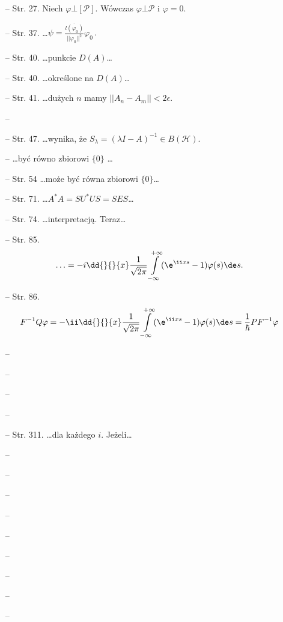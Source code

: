 \begin{itemize}
\item[--] Str. 27. Niech $\varphi \bot [ \mathcal{ P } ]$.  Wówczas
  $\varphi \bot \mathcal{ P }$ i $\varphi = 0$.
\item[--] Str. 37.
  \ldots$\psi = \frac{ \overline{ l ( \varphi_{ 0 } ) } }{ ||
    \varphi_{ 0 } ||^{ 2 } } \varphi_{ 0 } \, .$
\item[--] Str. 40. \ldots punkcie $D( A )$\ldots
\item[--] Str. 40. \ldots określone na $D( A )$\ldots
\item[--] Str. 41. \ldots dużych $n$ mamy
  $|| A_{ n } - A_{ m } || < 2 \epsilon$.
\item[--]
\item[--] Str. 47. \ldots wynika, że
  $S_{ \lambda } = ( \lambda I - A )^{ -1 } \in B( \mathcal{ H } )$.
\item[--] \ldots być równo zbiorowi $\{ 0 \}$ \ldots
\item[--] Str. 54 \ldots może być równa zbiorowi $\{ 0 \}$\ldots
\item[--] Str. 71. \ldots$A^{ * } A = S U^{ * } U S = S E S$\ldots
\item[--] Str. 74. \ldots interpretacją. Teraz\ldots
\item[--] Str. 85.
  $$\ldots = -i \dd{}{}{ x } \frac{ 1 }{ \sqrt{ 2 \pi } }
  \int\limits_{ -\infty }^{ +\infty } ( \e^{ \ii x s } - 1 ) \varphi(
  s ) \de s \textrm{.}$$
\item[--] Str. 86.
  $$F^{ -1 } Q \varphi = -\ii \dd{}{}{ x } \frac{ 1 }{ \sqrt{ 2 \pi }
  } \int\limits_{ -\infty }^{ +\infty } ( \e^{ \ii x s } - 1 )
  \varphi( s ) \de s = \frac{ 1 }{ \hbar } P F^{ -1 } \varphi$$
\item[--]
\item[--]
\item[--]
\item[--]
\item[--] Str. 311. \ldots dla każdego $i$. Jeżeli\ldots
\item[--]
\item[--]
\item[--]
\item[--]
\item[--]
\item[--]
\item[--]
\item[--]
\item[--]
\end{itemize}



